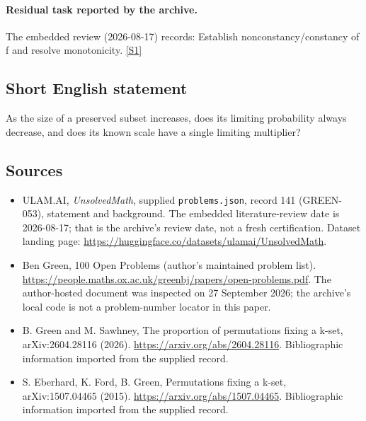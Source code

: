 \documentclass[11pt,a4paper]{article}
\newcommand{\sref}[2]{\hyperlink{source:#1:#2}{[S#2]}}
\begin{document}
\paragraph{Residual task reported by the archive.}

The embedded review (2026-08-17) records: Establish nonconstancy/constancy of f and resolve monotonicity. \sref{141}{1}

\subsection{Short English statement}

As the size of a preserved subset increases, does its limiting probability always decrease, and does its known scale have a single limiting multiplier?

\subsection{Sources}

{\small

\begin{itemize}

\item[\hypertarget{source:141:1}{S1}] ULAM.AI, \emph{UnsolvedMath}, supplied \texttt{problems.json}, record 141 (GREEN-053), statement and background. The embedded literature-review date is 2026-08-17; that is the archive’s review date, not a fresh certification. Dataset landing page: \url{https://huggingface.co/datasets/ulamai/UnsolvedMath}.

\item[\hypertarget{source:141:2}{S2}] Ben Green, 100 Open Problems (author’s maintained problem list). \url{https://people.maths.ox.ac.uk/greenbj/papers/open-problems.pdf}. The author-hosted document was inspected on 27 September 2026; the archive’s local code is not a problem-number locator in this paper.

\item[\hypertarget{source:141:3}{S3}] B. Green and M. Sawhney, The proportion of permutations fixing a k-set, arXiv:2604.28116 (2026). \url{https://arxiv.org/abs/2604.28116}. Bibliographic information imported from the supplied record.

\item[\hypertarget{source:141:4}{S4}] S. Eberhard, K. Ford, B. Green, Permutations fixing a k-set, arXiv:1507.04465 (2015). \url{https://arxiv.org/abs/1507.04465}. Bibliographic information imported from the supplied record.

\end{itemize}

}

\label{end:141}
\end{document}
